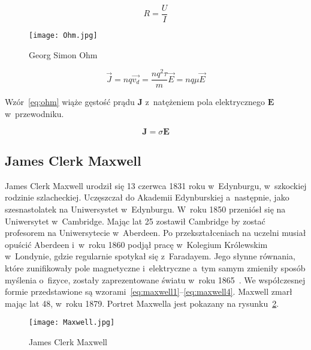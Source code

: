 \begin{equation}
    R = \frac{U}{I}
\end{equation}

\begin{figure}[!h]
    \centering \texttt{[image: Ohm.jpg]}
    \caption{Georg Simon Ohm}
    \label{rys:ohm}
\end{figure}

\begin{equation*}
    \vec{J} = nq \vec{v_d} =  \frac{nq^2 \tau}{m} \vec{E} = nq \mu \vec{E}
\end{equation*}

Wzór~\ref{eq:ohm} wiąże gęstość prądu $\pmb{J}$ z~natężeniem pola elektrycznego $\pmb{E}$ w~przewodniku.

\begin{equation}
    \pmb{J} = \sigma \pmb{E}
    \label{eq:ohm}
\end{equation}


\subsection{James Clerk Maxwell}
James Clerk Maxwell urodził się 13 czerwca 1831 roku w~Edynburgu, w~szkockiej rodzinie szlacheckiej. Uczęszczał do Akademii Edynburskiej a~następnie, jako szesnastolatek na Uniwersystet w~Edynburgu. W~roku 1850 przeniósł się na Uniwersytet w~Cambridge. Mając lat 25 zostawił Cambridge by zostać profesorem na Uniwersytecie w~Aberdeen. Po przekształceniach na uczelni musiał opuścić Aberdeen i~w~roku 1860 podjął pracę w~Kolegium Królewskim w~Londynie, gdzie regularnie spotykał się z~Faradayem. Jego słynne równania, które zunifikowały pole magnetyczne i~elektryczne a~tym samym zmieniły sposób myślenia o~fizyce, zostały zaprezentowane światu w~roku 1865~\cite{maxwell1865}. We współczesnej formie przedstawione są wzorami~\ref{eq:maxwell1}--\ref{eq:maxwell4}. Maxwell zmarł mając lat 48, w~roku 1879. Portret Maxwella jest pokazany na rysunku~\ref{rys:maxwell}.

\begin{figure}[!t]
    \centering \texttt{[image: Maxwell.jpg]}
    \caption{James Clerk Maxwell}
    \label{rys:maxwell}
\end{figure}

